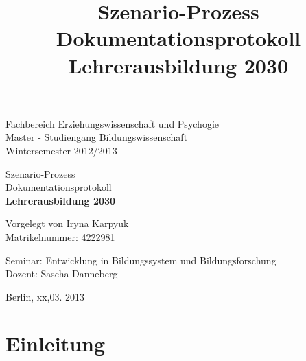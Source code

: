 \documentclass[12pt,a4paper]{article}
\author{}
\title{ Szenario-Prozess\\ Dokumentationsprotokoll\\ \textbf{Lehrerausbildung 2030} }
\begin{document}
\begin{titlepage}

\normalsize

\begin{flushleft}
Fachbereich Erziehungswissenschaft und Psychogie \\
Master - Studiengang Bildungswissenschaft \\
Wintersemester 2012/2013 \\
\end{flushleft}

\vspace{120pt}

\begin{center}
\huge
Szenario-Prozess\\ Dokumentationsprotokoll\\ \textbf{Lehrerausbildung 2030}
\vspace{60pt}
                         
\normalsize                               
Vorgelegt von Iryna Karpyuk\\
Matrikelnummer: 4222981
\end{center}                  
           
\begin{flushleft}
\normalsize
\vspace{100pt}

Seminar: Entwicklung in Bildungssystem und Bildungsforschung\\ 
Dozent: Sascha Danneberg\\
\vspace{60pt}

Berlin, xx,03. 2013
\end{flushleft}
\end{titlepage}
\normalsize                                              
\pagebreak

\tableofcontents

\pagebreak

\section{Einleitung}
\end{document}
